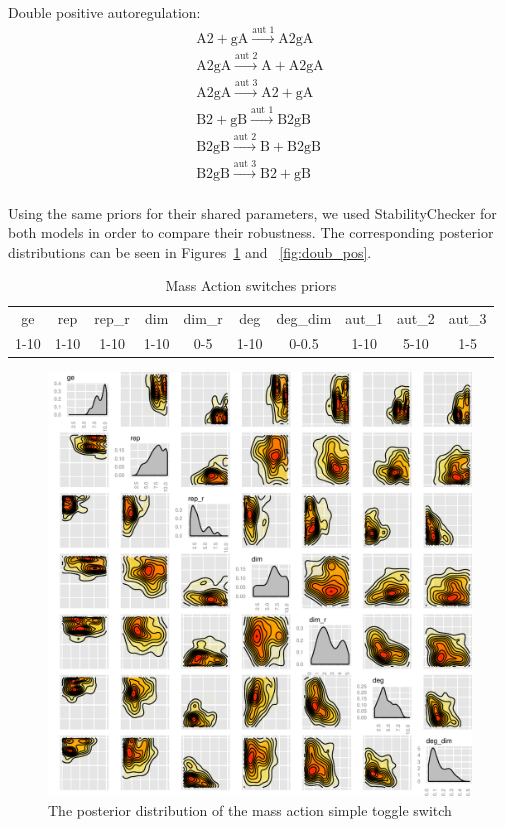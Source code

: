 Double positive autoregulation:
$$
\begin{array}{cccc} 
    \textrm{A2} + \textrm{gA} \stackrel{\textrm{aut 1}}{\longrightarrow} \textrm{A2gA} \\
    \textrm{A2gA} \stackrel{\textrm{aut 2}}{\longrightarrow} \textrm{A} + \textrm{A2gA}\\
    \textrm{A2gA} \stackrel{\textrm{aut 3}}{\longrightarrow} \textrm{A2}+ \textrm{gA}  \\
    \textrm{B2} + \textrm{gB} \stackrel{\textrm{aut 1}}{\longrightarrow} \textrm{B2gB} \\
    \textrm{B2gB} \stackrel{\textrm{aut 2}}{\longrightarrow} \textrm{B} + \textrm{B2gB}\\
    \textrm{B2gB} \stackrel{\textrm{aut 3}}{\longrightarrow} \textrm{B2}+ \textrm{gB}  \\
\end{array}
$$

Using the same priors for their shared parameters, we used StabilityChecker for both models in order to compare their robustness. The corresponding posterior distributions can be seen in Figures~\ref{fig:det_std} and ~\ref{fig:doub_pos}.

\begin{table}[p]
\centering
\caption{Mass Action switches priors}
\label{tab:simp}
\begin{tabular}{cccccccccc}
ge   & rep  & rep\_r & dim  & dim\_r & deg & deg\_dim & aut\_1 & aut\_2 & aut\_3\\
1-10 & 1-10 & 1-10    & 1-10 & 0-5    & 1-10 & 0-0.5   &1-10&5-10&1-5
\end{tabular}
\end{table}


\begin{figure}[p]
\centering
\includegraphics[scale=0.7]{chapterModelling/images/posterior_ma_cl_bi.pdf}
\caption{The posterior distribution of the mass action simple toggle switch}
\label{fig:det_std}
\end{figure}

